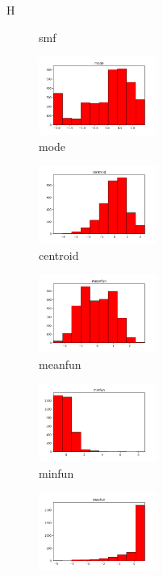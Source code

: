 \documentclass[a4paper]{article}    %
\begin{document}
\begin{figure}{H}
\begin{subfigure}{0.32\textwidth}
        \caption{smf}
        \label{fig:sub_std_9}
    \end{subfigure}\hfill
    \begin{subfigure}{0.32\textwidth}
        \centering
        \includegraphics[width=3.85cm]{std_9_mode}
        \caption{mode}
        \label{fig:sub_std_10}
    \end{subfigure}\hfill
    \begin{subfigure}{0.32\textwidth}
        \centering
        \includegraphics[width=3.85cm]{std_10_centroid}
        \caption{centroid}
        \label{fig:sub_std_11}
    \end{subfigure}\hfill
    \begin{subfigure}{0.32\textwidth}
        \centering
        \includegraphics[width=3.85cm]{std_11_meanfun}
        \caption{meanfun}
        \label{fig:sub_std_12}
    \end{subfigure}\hfill
    \begin{subfigure}{0.32\textwidth}
        \centering
        \includegraphics[width=3.85cm]{std_12_minfun}
        \caption{minfun}
        \label{fig:sub_std_13}
    \end{subfigure}\hfill
    \begin{subfigure}{0.32\textwidth}
        \centering
        \includegraphics[width=3.85cm]{std_13_maxfun}

\end{subfigure}
\end{figure}
\end{document}
